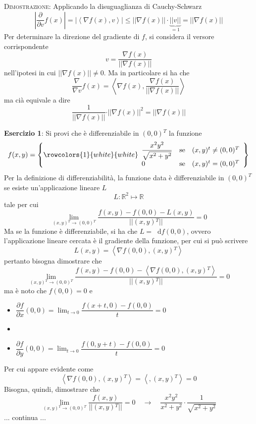 \documentclass[a4paper]{extarticle}
\newcommand*\dif{\mathop{}\!\mathrm{d}}
\begin{document}
\vspace{2em}
\noindent
\normalfont \normalsize
\textsc{Dimostrazione}: Applicando la disuguaglianza di Cauchy-Schwarz
\[\left \vert \frac{\partial}{\partial v} f(x) \right \vert = \left \vert \left<\nabla f(x), v \right> \right \vert \leq \vert \vert \nabla f(x) \vert \vert \cdot \underbrace{\vert \vert v \vert \vert}_{=1} = \vert \vert \nabla f(x) \vert \vert\]
Per determinare la direzione del gradiente di $f$, si considera il versore corrispondente
\[v=\frac{\nabla f(x)}{\vert \vert \nabla f(x) \vert \vert}\]
nell'ipotesi in cui $\vert \vert \nabla f(x) \vert \vert \neq 0$. Ma in particolare si ha che
\[\frac{\nabla}{\nabla v} f(x) = \left<\nabla f(x), \frac{\nabla f(x)}{\vert \vert \nabla f(x) \vert \vert}\right>\]
ma cià equivale a dire
\[\frac{1}{\vert \vert \nabla f(x) \vert \vert} \cdot \vert \vert \nabla f(x) \vert \vert^2 = \vert \vert \nabla f(x) \vert \vert\]

\vspace{2em}
\noindent
\textbf{Esercizio 1}: Si provi che è differenziabile in $(0,0){^T}$ la funzione
\[
    f(x,y)=\left\{
        \rowcolors{1}{white}{white}    
        \begin{array}{lll}
            \dfrac{x^2y^2}{\sqrt{x^2+y^2}} & \text{se} & (x,y){^t} \neq (0,0){^T}\\
            0   & \text{se} & (x,y){^t} = (0,0){^T}\\
        \end{array}
    \right\}
\]
Per la definizione di differenziabilità, la funzione data è differenziabile in $(0,0)^T$ se esiste un'applicazione lineare $L$
\[L : \mathbb{R}^2 \longmapsto \mathbb{R}\]
tale per cui
\[\lim_{(x,y){^T} \to (0,0){^T}} \dfrac{f(x,y) - f(0,0) - L(x,y)}{\vert \vert (x,y){^T} \vert \vert} = 0\]
Ma se la funzione è differenziabile, si ha che $L=\dif f(0,0)$, ovvero l'applicazione lineare cercata è il gradiente della funzione, per cui si può scrivere
\[L(x,y) = \left<\nabla f(0,0), (x,y){^T} \right>\]
pertanto bisogna dimostrare che
\[\lim_{(x,y){^T} \to (0,0){^T}} \dfrac{f(x,y) - f(0,0) - \left<\nabla f(0,0), (x,y){^T} \right>}{\vert \vert (x,y){^T} \vert \vert} = 0\]
ma è noto che $f(0,0)=0$ e
\begin{itemize}
    \item $\dfrac{\partial f}{\partial x} (0,0) = \lim_{t \to 0} \dfrac{f(x+t,0) - f(0,0)}{t} = 0$
    \item \item $\dfrac{\partial f}{\partial y} (0,0) = \lim_{t \to 0} \dfrac{f(0,y+t) - f(0,0)}{t} = 0$
\end{itemize}
Per cui appare evidente come
\[\left<\nabla f(0,0), (x,y){^T} \right> = \left<, (x,y){^T} \right> = 0\]
Bisogna, quindi, dimostrare che
\[\lim_{(x,y){^T} \to (0,0){^T}} \dfrac{f(x,y)}{\vert \vert (x,y){^T} \vert \vert} = 0 \hspace{1em} \rightarrow \hspace{1em} \dfrac{x^2y^2}{x^2+y^2} \cdot \dfrac{1}{\sqrt{x^2+y^2}}\]
... continua ...
\end{document}

